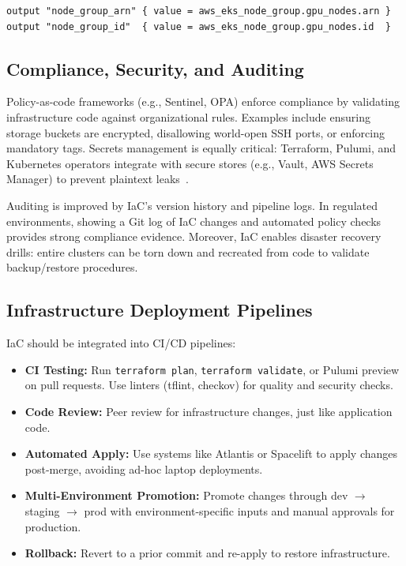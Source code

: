 \begin{codebox}
\begin{verbatim}
output "node_group_arn" { value = aws_eks_node_group.gpu_nodes.arn }
output "node_group_id"  { value = aws_eks_node_group.gpu_nodes.id  }
\end{verbatim}
\end{codebox}

\subsection{Compliance, Security, and Auditing}
\label{sec:iac-compliance}

Policy-as-code frameworks (e.g., Sentinel, OPA) enforce compliance by validating infrastructure code against organizational rules. Examples include ensuring storage buckets are encrypted, disallowing world-open SSH ports, or enforcing mandatory tags. Secrets management is equally critical: Terraform, Pulumi, and Kubernetes operators integrate with secure stores (e.g., Vault, AWS Secrets Manager) to prevent plaintext leaks~\cite{opa-docs,sentinel-docs}. 

Auditing is improved by IaC’s version history and pipeline logs. In regulated environments, showing a Git log of IaC changes and automated policy checks provides strong compliance evidence. Moreover, IaC enables disaster recovery drills: entire clusters can be torn down and recreated from code to validate backup/restore procedures.

\subsection{Infrastructure Deployment Pipelines}
\label{sec:iac-pipelines}

IaC should be integrated into CI/CD pipelines:
\begin{itemize}
  \item \textbf{CI Testing:} Run \texttt{terraform plan}, \texttt{terraform validate}, or Pulumi preview on pull requests. Use linters (tflint, checkov) for quality and security checks.
  \item \textbf{Code Review:} Peer review for infrastructure changes, just like application code.
  \item \textbf{Automated Apply:} Use systems like Atlantis or Spacelift to apply changes post-merge, avoiding ad-hoc laptop deployments.
  \item \textbf{Multi-Environment Promotion:} Promote changes through dev $\rightarrow$ staging $\rightarrow$ prod with environment-specific inputs and manual approvals for production.
  \item \textbf{Rollback:} Revert to a prior commit and re-apply to restore infrastructure.
\end{itemize}

